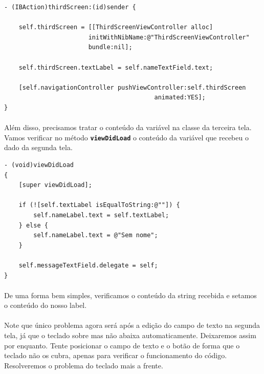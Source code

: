 \documentclass[a4paper,12pt,brazil,doubleside]{book}
\begin{document}
\begin{listing}
\begin{verbatim}
- (IBAction)thirdScreen:(id)sender {
    
    self.thirdScreen = [[ThirdScreenViewController alloc]
                       initWithNibName:@"ThirdScreenViewController"
                       bundle:nil];
    
    self.thirdScreen.textLabel = self.nameTextField.text;
    
    [self.navigationController pushViewController:self.thirdScreen
                                         animated:YES];
}
\end{verbatim}
\end{listing}

\bigskip

\paragraph{}Além disso, precisamos tratar o conteúdo da variável na classe da terceira tela. Vamos verificar no método \texttt{\textbf{viewDidLoad}} o conteúdo da variável que recebeu o dado da segunda tela.

\begin{listing}
\begin{verbatim}
- (void)viewDidLoad
{
    [super viewDidLoad];
    
    if (![self.textLabel isEqualToString:@""]) {
        self.nameLabel.text = self.textLabel;
    } else {
        self.nameLabel.text = @"Sem nome";
    }
    
    self.messageTextField.delegate = self;
}
\end{verbatim}
\end{listing}

\bigskip

\paragraph{}De uma forma bem simples, verificamos o conteúdo da string recebida e setamos o conteúdo do nosso label.
\paragraph{}Note que único problema agora será após a edição do campo de texto na segunda tela, já que o teclado sobre mas não abaixa automaticamente. Deixaremos assim por enquanto. Tente posicionar o campo de texto e o botão de forma que o teclado não os cubra, apenas para verificar o funcionamento do código. Resolveremos o problema do teclado mais a frente.
\end{document}
